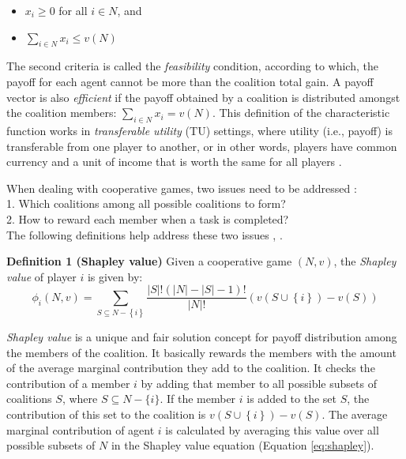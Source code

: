 \documentclass[10pt,journal,cspaper,compsoc]{IEEEtran}
\begin{document}
\begin{itemize}
    \item $x_i \geq 0$ for all $i \in N$, and
    \item $\sum_{i \in N} x_i \leq v(N)$
\end{itemize}


The second criteria is called the \emph{feasibility} condition,
according to which, the payoff for each agent cannot be more than
the coalition total gain. A payoff vector is also \emph{efficient}
if the payoff obtained by a coalition is distributed amongst the
coalition members: $\sum_{i \in N} x_i = v(N)$. This definition of
the characteristic function works in \emph{transferable utility}
(TU) settings, where utility (i.e., payoff) is transferable from
one player to another, or in other words, players have common
currency and a unit of income that is worth the same for all
players \cite{myerson1991game}.


When dealing with cooperative games, two issues need to be
addressed  \cite{
DBLP:conf/ijcai/GrecoMPS11,Sandholm1999209,DBLP:conf/ijcai/RahwanMJ11}:\\ 1. Which coalitions among all possible coalitions to form? \\
2. How to reward each member when a task is completed?\\
%
The following definitions help address these two issues
\cite{shapley_value}, \cite{S1971cores}.


{\bf Definition 1 (Shapley value)} Given a cooperative game $(N,
v)$, the \emph{Shapley value} of player $i$ is given by:
\begin{equation}\label{eq:shapley}
\phi_i(N,v) = \sum_{S \subseteq N - \left\{i\right\} } \frac{|S|!
(|N|-|S|-1)!}{|N|!} (v(S \cup \left\{i\right\}) - v(S))
\end{equation}


\emph{Shapley value} is a unique and fair solution concept for
payoff distribution among the members of the coalition. It
basically rewards the members with the amount of the average
marginal contribution they add to the coalition. It checks the
contribution of a member $i$ by adding that member to all possible
subsets of coalitions $S$, where $S \subseteq N-\{i\}$. If the
member $i$ is added to the set $S$, the contribution of this set
to the coalition is $v(S \cup \left\{i\right\}) - v(S)$. The
average marginal contribution of agent $i$ is calculated by
averaging this value over all possible subsets of $N$ in the
Shapley value equation (Equation \ref{eq:shapley}).
\end{document}
